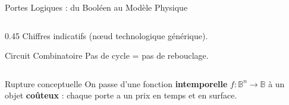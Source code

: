 \begin{frame}{Portes Logiques : du Booléen au Modèle Physique}
\begin{columns}[T]
\begin{column}{0.45\textwidth}
            {\footnotesize Chiffres indicatifs (nœud technologique générique).}

            \begin{alertblock}{Circuit Combinatoire}
              Pas de cycle = pas de rebouclage.
            \end{alertblock}
        \end{column}
    \end{columns}

    \vspace{0.2cm}

    \begin{alertblock}{Rupture conceptuelle}
        \centering
        On passe d'une fonction \textbf{intemporelle} \(f : \mathbb{B}^n \to \mathbb{B}\) à un objet \textbf{coûteux} : chaque porte a un prix en temps et en surface.
    \end{alertblock}

\end{frame}
%
%
%
%
%
